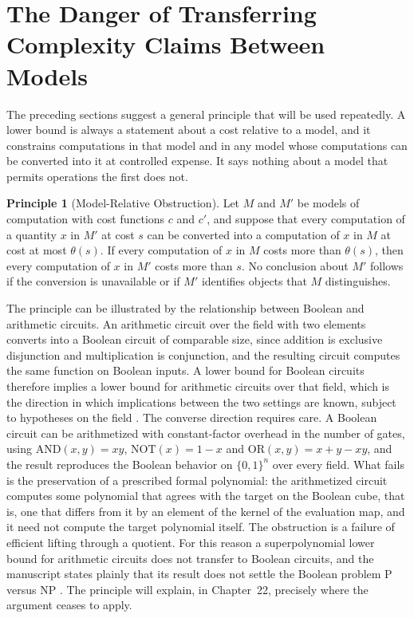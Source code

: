 \documentclass[11pt,letterpaper]{report}
\theoremstyle{plain}
\theoremstyle{definition}
\newtheorem{principle}[theorem]{Principle}
\theoremstyle{remark}
\newcommand{\PTIME}{\mathrm{P}}
\newcommand{\NP}{\mathrm{NP}}
\begin{document}
\section{The Danger of Transferring Complexity Claims Between Models}

The preceding sections suggest a general principle that will be used repeatedly. A lower bound is always a statement about a cost relative to a model, and it constrains computations in that model and in any model whose computations can be converted into it at controlled expense. It says nothing about a model that permits operations the first does not.

\begin{principle}[Model-Relative Obstruction]\label{pr:mro}
Let $M$ and $M'$ be models of computation with cost functions $c$ and $c'$, and suppose that every computation of a quantity $x$ in $M'$ at cost $s$ can be converted into a computation of $x$ in $M$ at cost at most $\theta(s)$. If every computation of $x$ in $M$ costs more than $\theta(s)$, then every computation of $x$ in $M'$ costs more than $s$. No conclusion about $M'$ follows if the conversion is unavailable or if $M'$ identifies objects that $M$ distinguishes.
\end{principle}

The principle can be illustrated by the relationship between Boolean and arithmetic circuits. An arithmetic circuit over the field with two elements converts into a Boolean circuit of comparable size, since addition is exclusive disjunction and multiplication is conjunction, and the resulting circuit computes the same function on Boolean inputs. A lower bound for Boolean circuits therefore implies a lower bound for arithmetic circuits over that field, which is the direction in which implications between the two settings are known, subject to hypotheses on the field \cite{Burgisser2000b}. The converse direction requires care. A Boolean circuit can be arithmetized with constant-factor overhead in the number of gates, using $\mathrm{AND}(x,y)=xy$, $\mathrm{NOT}(x)=1-x$ and $\mathrm{OR}(x,y)=x+y-xy$, and the result reproduces the Boolean behavior on $\{0,1\}^n$ over every field. What fails is the preservation of a prescribed formal polynomial: the arithmetized circuit computes some polynomial that agrees with the target on the Boolean cube, that is, one that differs from it by an element of the kernel of the evaluation map, and it need not compute the target polynomial itself. The obstruction is a failure of efficient lifting through a quotient. For this reason a superpolynomial lower bound for arithmetic circuits does not transfer to Boolean circuits, and the manuscript states plainly that its result does not settle the Boolean problem $\PTIME$ versus $\NP$ \cite{Source2026}. The principle will explain, in Chapter~22, precisely where the argument ceases to apply.
\end{document}
